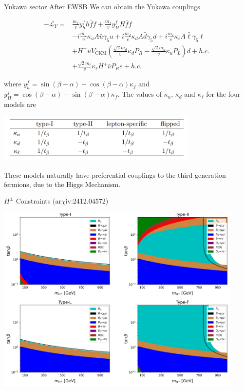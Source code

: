 \documentclass{../bredelebeamer}
\newcommand{\arxiv}{ar$\chi$iv:}
\begin{document}
\begin{frame}{Yukawa sector After EWSB}
    We can obtain the Yukawa couplings

    $$
    \begin{aligned}
    -\mathcal{L}_Y= & \frac{m_f}{v} y_h^f h \bar{f} f+\frac{m_f}{v} y_H^f H \bar{f} f \\
    & -i \frac{m_u}{v} \kappa_u A \bar{u} \gamma_5 u+i \frac{m_d}{v} \kappa_d A \bar{d} \gamma_5 d+i \frac{m_{\ell}}{v} \kappa_{\ell} A \bar{\ell} \gamma_5 \ell \\
    & +H^{+} \bar{u} V_{\mathrm{CKM}}\left(\frac{\sqrt{2} m_d}{v} \kappa_d P_R-\frac{\sqrt{2} m_u}{v} \kappa_u P_L\right) d+h . c . \\
    & +\frac{\sqrt{2} m_{\ell}}{v} \kappa_{\ell} H^{+} \bar{\nu} P_R e+h . c .
    \end{aligned}
    $$

    where $y_h^f=\sin (\beta-\alpha)+\cos (\beta-\alpha) \kappa_f$ and $y_H^f=\cos (\beta-\alpha)-\sin (\beta-\alpha) \kappa_f$. The values of $\kappa_u$, $\kappa_d$ and $\kappa_{\ell}$ for the four models are
    \begin{center}
        \includegraphics[width=0.75\textwidth]{Table_kappa.png}
    \end{center}
    These models naturally have preferential couplings to the third generation fermions, due to the Higgs Mechanism.
\end{frame}
\begin{frame}{$H^\pm$ Constraints (\arxiv 2412.04572)}
    \begin{center}
        \includegraphics[width=0.92\textwidth]{Hpm_Constrains_by_Model.png}
    \end{center}
\end{frame}
\end{document}
